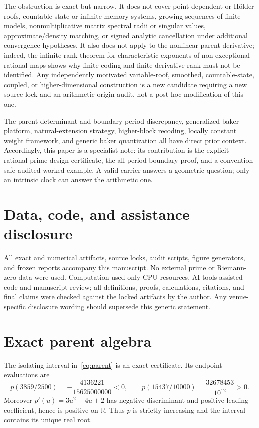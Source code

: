 \documentclass[11pt]{article}
\theoremstyle{definition}
\theoremstyle{remark}
\begin{document}
The obstruction is exact but narrow.  It does not cover point-dependent or
H\"older roofs, countable-state or infinite-memory systems, growing sequences
of finite models, nonmultiplicative matrix spectral radii or singular values,
approximate/density matching, or signed analytic cancellation under additional
convergence hypotheses.  It also does not apply to the nonlinear parent
derivative; indeed, the infinite-rank theorem for characteristic exponents of
non-exceptional rational maps \citep{ji2026space} shows why finite coding and
finite derivative rank must not be identified.  Any independently motivated
variable-roof, smoothed, countable-state, coupled, or higher-dimensional
construction is a new candidate requiring a new source lock and an
arithmetic-origin audit, not a post-hoc modification of this one.

The parent determinant and boundary-period discrepancy, generalized-baker
platform, natural-extension strategy, higher-block recoding, locally constant
weight framework, and generic baker quantization all have direct prior context.
Accordingly, this paper is a specialist note: its contribution is the explicit
rational-prime design certificate, the all-period boundary proof, and a
convention-safe audited worked example.  A valid carrier answers a geometric
question; only an intrinsic clock can answer the arithmetic one.

\section*{Data, code, and assistance disclosure}

All exact and numerical artifacts, source locks, audit scripts, figure
generators, and frozen reports accompany this manuscript.  No external prime
or Riemann-zero data were used.  Computation used only CPU resources.  AI
tools assisted code and manuscript review; all definitions, proofs,
calculations, citations, and final claims were checked against the locked
artifacts by the author.  Any venue-specific disclosure wording should
supersede this generic statement.

\appendix

\section{Exact parent algebra}
\label{app:parent}

The isolating interval in~\eqref{eq:parent} is an exact certificate.  Its
endpoint evaluations are
\begin{equation}
 p(3859/2500)=-\frac{4136221}{15625000000}<0,
 \qquad
 p(15437/10000)=\frac{32678453}{10^{12}}>0.
 \label{eq:root-signs}
\end{equation}
Moreover \(p'(u)=3u^2-4u+2\) has negative discriminant and positive leading
coefficient, hence is positive on \(\mathbb R\).  Thus \(p\) is strictly
increasing and the interval contains its unique real root.
\end{document}
